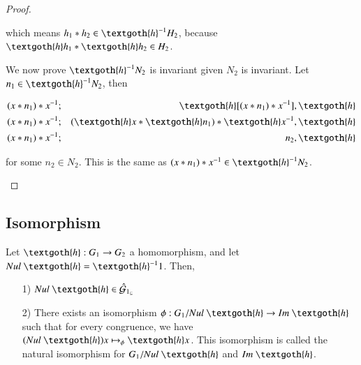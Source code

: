 \documentclass [12pt]{book}
\begin{document}
\begin{proof}
\begin{itemize}
which means $h_{1}*h_{2}\in \textgoth{h}^{-1}H_{2}$, because $\textgoth{h}h_{1}*\textgoth{h}h_{2}\in H_{2}$.

We now prove $\textgoth{h}^{-1}N_{2}$ is invariant given $N_{2}$ is invariant. Let $n_{1}\in \textgoth{h}^{-1}N_{2}$, then

\begin{eqnarray}\nonumber (x*n_{1})*x^{-1}&;&\textgoth{h}[(x*n_{1})
*x^{-1}],\textgoth{h}\\\nonumber (x*n_{1})*x^{-1}&;&(\textgoth{h}x*\textgoth{h}n_{1})*\textgoth{h}x^{-1},
\textgoth{h}\\\nonumber (x*n_{1})*x^{-1}&;&
n_{2},\textgoth{h}\end{eqnarray}

for some $n_{2}\in N_{2}$. This is the same as $(x*n_{1})*x^{-1}\in\textgoth{h}^{-1}N_{2}$.

	\end{itemize}

\end{proof}


	\subsection{Isomorphism}

\begin{theorem}Let $\textgoth{h}:G_{1}\rightarrow G_{2}$ a homomorphism, and let $Nul~\textgoth{h}=\textgoth{h}^{-1}1$. Then,

\begin{itemize}\item[1)]$Nul~\textgoth{h}\in\hat{\mathcal{G}}_{1_{\subseteq}}$
\item[2)]There exists an isomorphism $\phi:G_{1}/Nul~\textgoth{h}\rightarrow Im~\textgoth{h}$ such that for every congruence, we have $(Nul~\textgoth{h})x\mapsto_{\phi}\textgoth{h}x$. This isomorphism is called the natural isomorphism for $G_{1}/Nul~\textgoth{h}$ and $Im~\textgoth{h}$.\end{itemize}\label{thGRPdecomp}\end{theorem}
\end{document}
